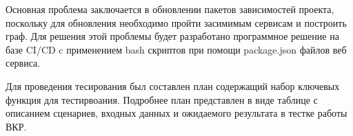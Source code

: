 Основная проблема заключается в обновлении пакетов зависимостей проекта, поскольку для обновления необходимо пройти засимимым сервисам и построить граф.
Для решения этой проблемы будет разработано программное решение на базе CI/CD c применением bash скриптов при помощи package.json файлов веб сервиса.

Для проведения тесирования был составлен план содержащий набор ключевых функция для тестирвоания.
Подробнее план представлен в виде таблице с описанием сценариев, входных данных и ожидаемого результата в тестке работы ВКР.


